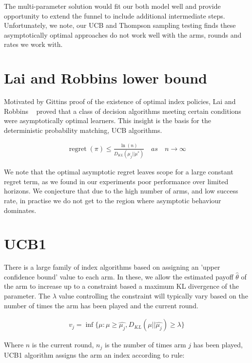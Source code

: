 \documentclass[11pt,a4,singlespacing,titlepagenumber=on]{scrreprt}
\numberwithin{equation}{chapter} %
\theoremstyle{remark}
\begin{document}
The multi-parameter solution would fit our both model well and provide opportunity to extend the funnel to include additional intermediate steps. Unfortunately, we note, our UCB and Thompson sampling testing finds these asymptotically optimal approaches do not work well with the arms, rounds and rates we work with.

\section{ Lai and Robbins lower bound }

Motivated by Gittins proof of the existence of optimal index policies, Lai and Robbins ~\cite{lai1985asymptotically} proved that a class of decision algorithms meeting certain conditions were asymptotically optimal learners. This insight is the basis for the deterministic probability matching, UCB algorithms. 

\begin{align}
\operatorname{regret}(\pi)  \leq  \frac{\ln(n)}{D_{KL}(\mu_j||\mu^{*})} \quad as \quad n \to \infty
\end{align}

We note that the optimal asymptotic regret leaves scope for a large constant regret term, as we found in our experiments poor performance over limited horizons. We conjecture that due to the high number of arms, and low success rate, in practise we do not get to the region where asymptotic behaviour dominates.

\section{ UCB1 }

There is a large family of index algorithms based on assigning an 'upper confidence bound' value to each arm. In these, we allow the estimated payoff $\hat{\theta}$ of the arm to increase up to a constraint based a maximum KL divergence of the parameter. The $\lambda$ value controlling the constraint will typically vary based on the number of times the arm has been played and the current round.

\begin{align}
v_j = \inf\{ \mu : \mu \geq \hat{\mu_j}, D_{KL}(\mu||\hat{\mu_j}) \geq \lambda\} 
\end{align}

Where $n$ is the current round, $n_j$ is the number of times arm $j$ has been played, UCB1 algorithm assigns the arm an index according to rule:
\end{document}
